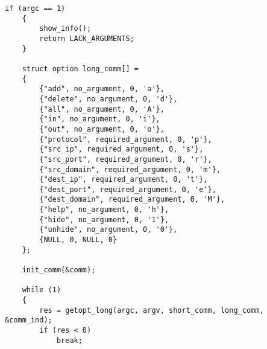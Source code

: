 \begin{lstlisting}[caption = {fw.c}]
	if (argc == 1)
	{
		show_info();
		return LACK_ARGUMENTS;
	}
	
	struct option long_comm[] = 
	{
		{"add", no_argument, 0, 'a'},
		{"delete", no_argument, 0, 'd'},
		{"all", no_argument, 0, 'A'},
		{"in", no_argument, 0, 'i'},
		{"out", no_argument, 0, 'o'},
		{"protocol", required_argument, 0, 'p'},
		{"src_ip", required_argument, 0, 's'},
		{"src_port", required_argument, 0, 'r'},
		{"src_domain", required_argument, 0, 'm'},
		{"dest_ip", required_argument, 0, 't'},
		{"dest_port", required_argument, 0, 'e'},
		{"dest_domain", required_argument, 0, 'M'},
		{"help", no_argument, 0, 'h'},
		{"hide", no_argument, 0, '1'},
		{"unhide", no_argument, 0, '0'},
		{NULL, 0, NULL, 0}
	};
	
	init_comm(&comm);
	
	while (1)
	{
		res = getopt_long(argc, argv, short_comm, long_comm, &comm_ind);
		if (res < 0)
			break;
		

\end{lstlisting}
